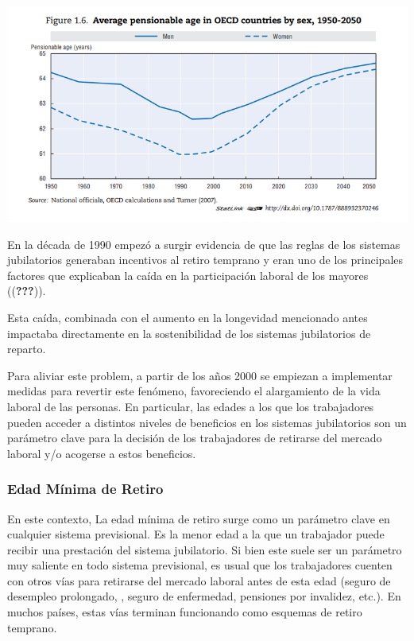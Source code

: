 \documentclass[]{article}
\begin{document}
\includegraphics{imgs/pensions-glance-fig1.6.png}

En la década de 1990 empezó a surgir evidencia de que las reglas de los
sistemas jubilatorios generaban incentivos al retiro temprano y eran uno
de los principales factores que explicaban la caída en la participación
laboral de los mayores (({\textbf{???}})).

Esta caída, combinada con el aumento en la longevidad mencionado antes
impactaba directamente en la sostenibilidad de los sistemas jubilatorios
de reparto.

Para aliviar este problem, a partir de los años 2000 se empiezan a
implementar medidas para revertir este fenómeno, favoreciendo el
alargamiento de la vida laboral de las personas. En particular, las
edades a los que los trabajadores pueden acceder a distintos niveles de
beneficios en los sistemas jubilatorios son un parámetro clave para la
decisión de los trabajadores de retirarse del mercado laboral y/o
acogerse a estos beneficios.

\hypertarget{edad-muxednima-de-retiro}{%
\subsubsection{Edad Mínima de Retiro}\label{edad-muxednima-de-retiro}}

En este contexto, La edad mínima de retiro surge como un parámetro clave
en cualquier sistema previsional. Es la menor edad a la que un
trabajador puede recibir una prestación del sistema jubilatorio. Si bien
este suele ser un parámetro muy saliente en todo sistema previsional, es
usual que los trabajadores cuenten con otros vías para retirarse del
mercado laboral antes de esta edad (seguro de desempleo prolongado, ,
seguro de enfermedad, pensiones por invalidez, etc.). En muchos países,
estas vías terminan funcionando como esquemas de retiro temprano.
\end{document}
